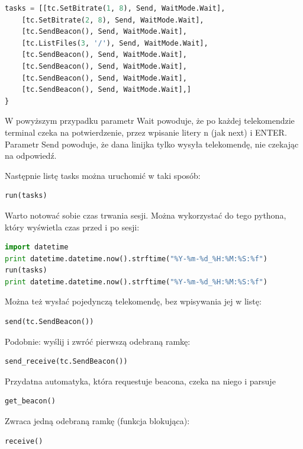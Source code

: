 \begin{lstlisting}[language=Python]
tasks = [[tc.SetBitrate(1, 8), Send, WaitMode.Wait],
	[tc.SetBitrate(2, 8), Send, WaitMode.Wait],
	[tc.SendBeacon(), Send, WaitMode.Wait],
	[tc.ListFiles(3, '/'), Send, WaitMode.Wait],
	[tc.SendBeacon(), Send, WaitMode.Wait],
	[tc.SendBeacon(), Send, WaitMode.Wait],
	[tc.SendBeacon(), Send, WaitMode.Wait],
	[tc.SendBeacon(), Send, WaitMode.Wait],]
}
\end{lstlisting}

W powyższym przypadku parametr Wait powoduje, że po każdej telekomendzie terminal czeka na potwierdzenie, przez wpisanie litery n (jak next) i ENTER. Parametr Send powoduje, że dana linijka tylko wysyła telekomendę, nie czekając na odpowiedź.

Następnie listę tasks można uruchomić w taki sposób:

\begin{lstlisting}[language=Python]
run(tasks)
\end{lstlisting}

Warto notować sobie czas trwania sesji. Można wykorzystać do tego pythona, który wyświetla czas przed i po sesji:

\begin{lstlisting}[language=Python]
import datetime
print datetime.datetime.now().strftime("%Y-%m-%d_%H:%M:%S:%f")
run(tasks)
print datetime.datetime.now().strftime("%Y-%m-%d_%H:%M:%S:%f")
\end{lstlisting}

Można też wysłać pojedynczą telekomendę, bez wpisywania jej w listę:

\begin{lstlisting}[language=Python]
send(tc.SendBeacon())
\end{lstlisting}

Podobnie: wyślij i zwróć pierwszą odebraną ramkę:

\begin{lstlisting}[language=Python]
send_receive(tc.SendBeacon())
\end{lstlisting}

Przydatna automatyka, która requestuje beacona, czeka na niego i parsuje

\begin{lstlisting}[language=Python]
get_beacon()
\end{lstlisting}

Zwraca jedną odebraną ramkę (funkcja blokująca):

\begin{lstlisting}[language=Python]
receive()
\end{lstlisting}

